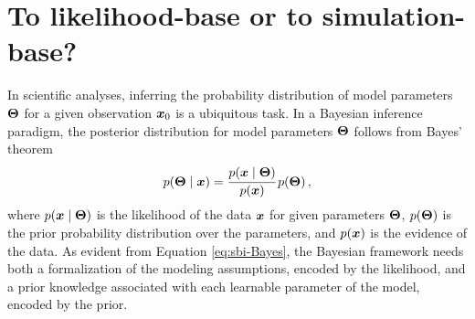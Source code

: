 \section{To likelihood-base or to simulation-base?}\label{sec:lbi-sbi}


In scientific analyses, inferring the probability distribution of model parameters $\bm{\Theta}$ for a given observation $\bm{x}_0$ is a ubiquitous task. 
In a Bayesian inference paradigm, the posterior distribution for model parameters $\bm{\Theta}$ follows from Bayes' theorem
\begin{equation} \label{eq:sbi-Bayes}
    p(\bm{\Theta}\mid\bm{x})=\cfrac{p(\bm{x}\mid\bm{\Theta})}{p(\bm{x})} \, p(\bm{\Theta}) \, ,
\end{equation}
where $p(\bm{x}\mid\bm{\Theta})$ is the likelihood of the data $\bm{x}$ for given parameters $\bm{\Theta}$, $p(\bm{\Theta})$ is the prior probability distribution over the parameters, and $p(\bm{x})$ is the evidence of the data.  
As evident from Equation \eqref{eq:sbi-Bayes}, the Bayesian framework needs both a formalization of the modeling assumptions, encoded by the likelihood, and a prior knowledge associated with each learnable parameter of the model, encoded by the prior. %

